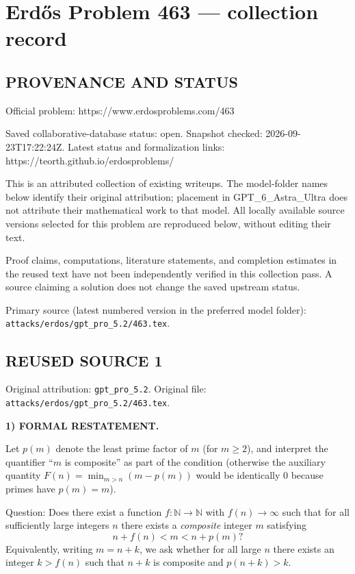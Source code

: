 \section*{Erd\H{o}s Problem 463 --- collection record}

\subsection*{PROVENANCE AND STATUS}
Official problem: https://www.erdosproblems.com/463

Saved collaborative-database status: open.
Snapshot checked: 2026-09-23T17:22:24Z.
Latest status and formalization links: https://teorth.github.io/erdosproblems/

This is an attributed collection of existing writeups. The model-folder names below identify their original attribution; placement in GPT\_6\_Astra\_Ultra does not attribute their mathematical work to that model. All locally available source versions selected for this problem are reproduced below, without editing their text.

Proof claims, computations, literature statements, and completion estimates in the reused text have not been independently verified in this collection pass. A source claiming a solution does not change the saved upstream status.

Primary source (latest numbered version in the preferred model folder): \texttt{attacks/erdos/gpt\_pro\_5.2/463.tex}.

\subsection*{REUSED SOURCE 1}
Original attribution: \texttt{gpt\_pro\_5.2}.
Original file: \texttt{attacks/erdos/gpt\_pro\_5.2/463.tex}.


\noindent\textbf{1) FORMAL RESTATEMENT.}

Let $p(m)$ denote the least prime factor of $m$ (for $m\ge 2$), and interpret the quantifier ``$m$ is composite'' as part of the condition (otherwise the auxiliary quantity $F(n)=\min_{m>n}(m-p(m))$ would be identically $0$ because primes have $p(m)=m$).

Question: Does there exist a function $f:\mathbb{N}\to\mathbb{N}$ with $f(n)\to\infty$ such that for all sufficiently large integers $n$ there exists a \emph{composite} integer $m$ satisfying
\[
 n+f(n)<m<n+p(m)?
\]
Equivalently, writing $m=n+k$, we ask whether for all large $n$ there exists an integer $k>f(n)$ such that $n+k$ is composite and $p(n+k)>k$.

